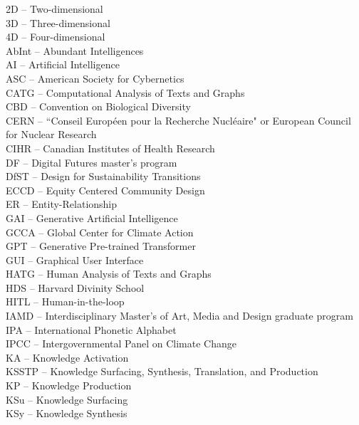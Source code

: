 \noindent 2D – Two-dimensional \\
\noindent 3D – Three-dimensional \\
\noindent 4D – Four-dimensional \\
\noindent AbInt – Abundant Intelligences \\
\noindent AI – Artificial Intelligence \\
\noindent ASC – American Society for Cybernetics \\
\noindent CATG – Computational Analysis of Texts and Graphs \\
\noindent CBD – Convention on Biological Diversity \\
\noindent CERN – ``Conseil Européen pour la Recherche Nucléaire" or European Council for Nuclear Research \\
\noindent CIHR – Canadian Institutes of Health Research \\
\noindent DF – Digital Futures master's program \\
\noindent DfST – Design for Sustainability Transitions \\
\noindent ECCD – Equity Centered Community Design \\
\noindent ER – Entity-Relationship \\
\noindent GAI – Generative Artificial Intelligence \\
\noindent GCCA – Global Center for Climate Action \\
\noindent GPT – Generative Pre-trained Transformer \\
\noindent GUI – Graphical User Interface \\
\noindent HATG – Human Analysis of Texts and Graphs \\
\noindent HDS – Harvard Divinity School \\
\noindent HITL – Human-in-the-loop \\
\noindent IAMD – Interdisciplinary Master's of Art, Media and Design graduate program \\
\noindent IPA – International Phonetic Alphabet \\
\noindent IPCC – Intergovernmental Panel on Climate Change \\
\noindent KA – Knowledge Activation \\
\noindent KSSTP – Knowledge Surfacing, Synthesis, Translation, and Production \\
\noindent KP – Knowledge Production \\
\noindent KSu – Knowledge Surfacing \\
\noindent KSy – Knowledge Synthesis  \\
